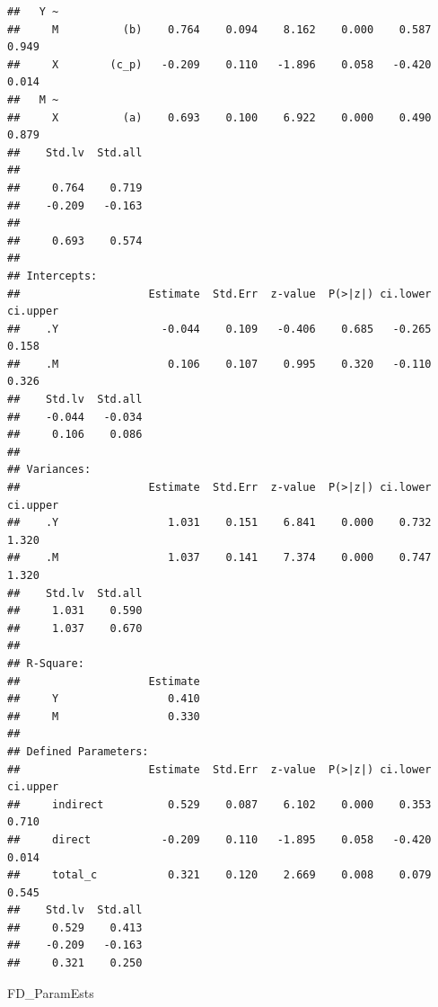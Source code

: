 \documentclass[
  11pt,
]{book}
\newenvironment{Shaded}{\begin{snugshade}}{\end{snugshade}}
\newcommand{\NormalTok}[1]{#1}
\begin{document}
\begin{verbatim}
##   Y ~                                                                   
##     M          (b)    0.764    0.094    8.162    0.000    0.587    0.949
##     X        (c_p)   -0.209    0.110   -1.896    0.058   -0.420    0.014
##   M ~                                                                   
##     X          (a)    0.693    0.100    6.922    0.000    0.490    0.879
##    Std.lv  Std.all
##                   
##     0.764    0.719
##    -0.209   -0.163
##                   
##     0.693    0.574
## 
## Intercepts:
##                    Estimate  Std.Err  z-value  P(>|z|) ci.lower ci.upper
##    .Y                -0.044    0.109   -0.406    0.685   -0.265    0.158
##    .M                 0.106    0.107    0.995    0.320   -0.110    0.326
##    Std.lv  Std.all
##    -0.044   -0.034
##     0.106    0.086
## 
## Variances:
##                    Estimate  Std.Err  z-value  P(>|z|) ci.lower ci.upper
##    .Y                 1.031    0.151    6.841    0.000    0.732    1.320
##    .M                 1.037    0.141    7.374    0.000    0.747    1.320
##    Std.lv  Std.all
##     1.031    0.590
##     1.037    0.670
## 
## R-Square:
##                    Estimate
##     Y                 0.410
##     M                 0.330
## 
## Defined Parameters:
##                    Estimate  Std.Err  z-value  P(>|z|) ci.lower ci.upper
##     indirect          0.529    0.087    6.102    0.000    0.353    0.710
##     direct           -0.209    0.110   -1.895    0.058   -0.420    0.014
##     total_c           0.321    0.120    2.669    0.008    0.079    0.545
##    Std.lv  Std.all
##     0.529    0.413
##    -0.209   -0.163
##     0.321    0.250
\end{verbatim}

\begin{Shaded}
\begin{Highlighting}[]
\NormalTok{FD\_ParamEsts}
\end{Highlighting}
\end{Shaded}
\end{document}
